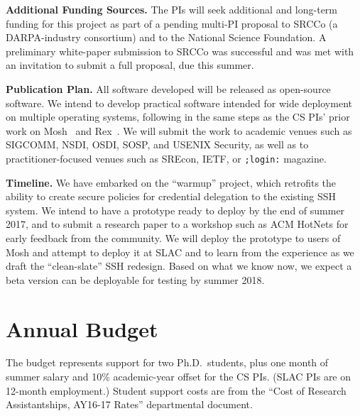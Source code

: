 \documentclass[10pt]{article}
\newcommand{\slim}{\vspace{0.5\baselineskip}}
\begin{document}
\slim

\noindent \textbf{Additional Funding Sources.} The PIs will seek
additional and long-term funding for this project as part
of a pending multi-PI proposal to SRCCo (a DARPA-industry consortium)
and to the National Science Foundation. A preliminary white-paper submission to SRCCo
was successful and was met with an invitation to submit a full proposal, due this summer.

\slim

\noindent \textbf{Publication Plan.} All software developed will be
released as open-source software.  We intend to develop practical
software intended for wide deployment on multiple operating systems,
following in the same steps as the CS PIs' prior work on
Mosh~\cite{Mosh} and Rex~\cite{rex}. We will submit the work to
academic venues such as SIGCOMM, NSDI, OSDI, SOSP, and USENIX
Security, as well as to practitioner-focused venues such as SREcon,
IETF, or \texttt{;login:} magazine.

\slim

\noindent \textbf{Timeline.} We have embarked on the ``warmup''
project, which retrofits the ability to create secure policies for
credential delegation to the existing SSH system. We intend to have a
prototype ready to deploy by the end of summer 2017, and to submit a
research paper to a workshop such as ACM HotNets for early feedback
from the community. We will deploy the prototype to users of Mosh and
attempt to deploy it at SLAC and to learn from the experience as we
draft the ``clean-slate'' SSH redesign. Based on what we know now, we
expect a beta version can be deployable for testing by summer 2018.

\vspace{-.5\baselineskip}
\enlargethispage{\baselineskip}

\section{Annual Budget}

The budget represents support for two Ph.D.~students, plus one month
of summer salary and 10\% academic-year offset for the CS PIs. (SLAC
PIs are on 12-month employment.) Student support costs are from the
``Cost of Research Assistantships, AY16-17 Rates'' departmental
document.

\slim
\end{document}
